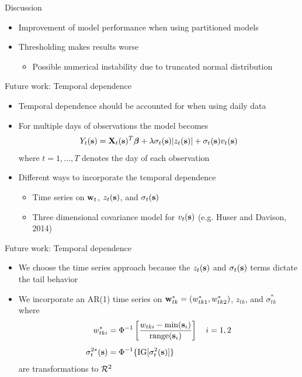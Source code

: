 \documentclass{beamer}
\begin{document}
\begin{frame}{Discussion}
  \begin{itemize} \setlength{\itemsep}{0.5em}
    \item Improvement of model performance when using partitioned models
    \item Thresholding makes results worse
    \begin{itemize}
      \item Possible numerical instability due to truncated normal distribution
    \end{itemize}
  \end{itemize}
\end{frame}

\begin{frame}{Future work: Temporal dependence}
  \begin{itemize} \setlength{\itemsep}{0.5em}
    \item Temporal dependence should be accounted for when using daily data
    \item For multiple days of observations the model becomes
      \begin{align*}
        Y_t(\mbox{\bf s}) = \mbox{\bf X}_t(\mbox{\bf s})^T \mbox{\boldmath $\beta$} + \lambda \sigma_t(\mbox{\bf s}) | z_t(\mbox{\bf s}) | + \sigma_t(\mbox{\bf s}) v_t(\mbox{\bf s})
      \end{align*}
      where $t = 1, \ldots, T$ denotes the day of each observation
    \item Different ways to incorporate the temporal dependence
    \begin{itemize}
      \item Time series on $\mbox{\bf w}_t$, $z_t(\mbox{\bf s})$, and $\sigma_t(\mbox{\bf s})$
      \item Three dimensional covariance model for $v_t(\mbox{\bf s})$ (e.g. Huser and Davison, 2014)
    \end{itemize}
  \end{itemize}
\end{frame}

\begin{frame}{Future work: Temporal dependence}
  \begin{itemize} \setlength{\itemsep}{0.5em}
    \item We choose the time series approach because the $z_t(\mbox{\bf s})$ and $\sigma_t(\mbox{\bf s})$ terms dictate the tail behavior
    \item We incorporate an AR(1) time series on $\mbox{\bf w}^*_{tk} = (w^*_{tk1}, w^*_{tk2})$, $z_{tk}$, and $\sigma^*_{tk}$ where
    \begin{align*}
      w^*_{tki} &= \Phi^{-1}\left[ \frac{w_{tki} - \min(\mbox{\bf s}_i)}{ \text{range}(\mbox{\bf s}_i)}\right] \quad i = 1, 2 \\[0.5em]
      \sigma^{2*}_t(\mbox{\bf s}) &= \Phi^{-1}\{ \text{IG}[\sigma^2_t(\mbox{\bf s})] \}
    \end{align*}
    are transformations to ${\cal R}^2$
  \end{itemize}
\end{frame}
\end{document}
